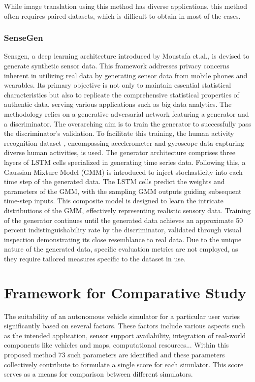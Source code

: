 \documentclass[12pt,twoside,a4paper,parskip]{scrbook} %
\begin{document}
While image translation using this method has diverse applications, this method often requires paired datasets, which is difficult to obtain in most of the cases.
\subsection{SenseGen}
Sensgen, a deep learning architecture introduced by Moustafa et.al., \cite{sensegen} is devised to generate synthetic sensor data. This framework addresses privacy concerns inherent in utilizing real data by generating sensor data from mobile phones and wearables. Its primary objective is not only to maintain essential statistical characteristics but also to replicate the comprehensive statistical properties of authentic data, serving various applications such as big data analytics.
The methodology relies on a generative adversarial network featuring a generator and a discriminator. The overarching aim is to train the generator to successfully pass the discriminator's validation. To facilitate this training, the human activity recognition dataset \cite{HAR} , encompassing accelerometer and gyroscope data capturing diverse human activities, is used. The generator architecture comprises three layers of LSTM cells \cite{lstm} specialized in generating time series data. Following this, a Gaussian Mixture Model (GMM) is introduced to inject stochasticity into each time step of the generated data. The LSTM cells predict the weights and parameters of the GMM, with the sampling GMM outputs guiding subsequent time-step inputs. This composite model is designed to learn the intricate distributions of the GMM, effectively representing realistic sensory data.
Training of the generator continues until the generated data achieves an approximate 50 percent indistinguishability rate by the discriminator, validated through visual inspection demonstrating its close resemblance to real data. Due to the unique nature of the generated data, specific evaluation metrics are not employed, as they require tailored measures specific to the dataset in use.

\chapter{Framework for Comparative Study}
The suitability of an autonomous vehicle simulator for a particular user varies significantly based on several factors. These factors include various aspects such as the intended application, sensor support availability, integration of real-world components like vehicles and maps, computational resources... Within this proposed method 73 such parameters are identified and these parameters collectively contribute to formulate a single score for each simulator. This score serves as a means for comparison between different simulators. 
\end{document}
